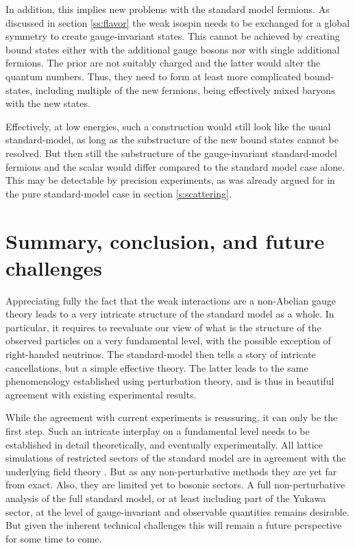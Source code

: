 \documentclass[final,twoside,12pt]{article}
\newcommand*{\1}{1\!\!\!\bot}
\begin{document}
In addition, this implies new problems with the standard model fermions. As discussed in section \ref{ss:flavor} the weak isospin needs to be exchanged for a global symmetry to create gauge-invariant states. This cannot be achieved by creating bound states either with the additional gauge bosons nor with single additional fermions. The prior are not suitably charged and the latter would alter the quantum numbers. Thus, they need to form at least more complicated bound-states, including multiple of the new fermions, being effectively mixed baryons with the new states.

Effectively, at low energies, such a construction would still look like the usual standard-model, as long as the substructure of the new bound states cannot be resolved. But then still the substructure of the gauge-invariant standard-model fermions and the scalar would differ compared to the standard model case alone. This may be detectable by precision experiments, as was already argued for in the pure standard-model case in section \ref{s:scattering}.

\section{Summary, conclusion, and future challenges}\label{s:sum}

Appreciating fully the fact that the weak interactions are a non-Abelian gauge theory leads to a very intricate structure of the standard model as a whole. In particular, it requires to reevaluate our view of what is the structure of the observed particles on a very fundamental level, with the possible exception of right-handed neutrinos. The standard-model then tells a story of intricate cancellations, but a simple effective theory. The latter leads to the same phenomenology established using perturbation theory, and is thus in beautiful agreement with existing experimental results.

While the agreement with current experiments is reassuring, it can only be the first step. Such an intricate interplay on a fundamental level needs to be established in detail theoretically, and eventually experimentally. All lattice simulations of restricted sectors of the standard model are in agreement with the underlying field theory \cite{Shrock:1985un,Shrock:1985ur,Lee:1985yi,Maas:2012tj,Maas:2013aia,Raubitzek:unpublished}. But as any non-perturbative methods they are yet far from exact. Also, they are limited yet to bosonic sectors. A full non-perturbative analysis of the full standard model, or at least including part of the Yukawa sector, at the level of gauge-invariant and observable quantities remains desirable. But given the inherent technical challenges this will remain a future perspective for some time to come.
\end{document}
